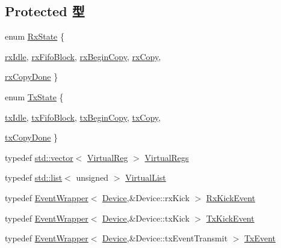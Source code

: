 \subsection*{Protected 型}
\begin{DoxyCompactItemize}
\item 
enum \hyperlink{classSinic_1_1Device_afa22e66eb5ea0daab0f0cd0360936f82}{RxState} \{ \par
\hyperlink{classSinic_1_1Device_afa22e66eb5ea0daab0f0cd0360936f82ab702fffa03e4cec4b054f71cfe34ce7c}{rxIdle}, 
\hyperlink{classSinic_1_1Device_afa22e66eb5ea0daab0f0cd0360936f82acd42510cc5c902cc3b338fee8106b4ca}{rxFifoBlock}, 
\hyperlink{classSinic_1_1Device_afa22e66eb5ea0daab0f0cd0360936f82ad650f06241a5757f0fa65acae2960b1f}{rxBeginCopy}, 
\hyperlink{classSinic_1_1Device_afa22e66eb5ea0daab0f0cd0360936f82acc200faa35bf75419147de6b805d083b}{rxCopy}, 
\par
\hyperlink{classSinic_1_1Device_afa22e66eb5ea0daab0f0cd0360936f82a8fbf22d6f8cc55993cc2a09d07418446}{rxCopyDone}
 \}
\item 
enum \hyperlink{classSinic_1_1Device_a96f29317c7f6628ea6a0c1bc5ab05d6a}{TxState} \{ \par
\hyperlink{classSinic_1_1Device_a96f29317c7f6628ea6a0c1bc5ab05d6aa6ae23f58218fed48a3f17abba689fcb6}{txIdle}, 
\hyperlink{classSinic_1_1Device_a96f29317c7f6628ea6a0c1bc5ab05d6aaf6571d0685a78da76fe4116ae36afdc3}{txFifoBlock}, 
\hyperlink{classSinic_1_1Device_a96f29317c7f6628ea6a0c1bc5ab05d6aaf2c21c54301af068a37b641c220915c1}{txBeginCopy}, 
\hyperlink{classSinic_1_1Device_a96f29317c7f6628ea6a0c1bc5ab05d6aa76918a4583683f130898f157b820164c}{txCopy}, 
\par
\hyperlink{classSinic_1_1Device_a96f29317c7f6628ea6a0c1bc5ab05d6aa60ba4d6a047deb74d1eccb2904472127}{txCopyDone}
 \}
\item 
typedef \hyperlink{classstd_1_1vector}{std::vector}$<$ \hyperlink{structSinic_1_1Device_1_1VirtualReg}{VirtualReg} $>$ \hyperlink{classSinic_1_1Device_aa30f329d058c1b4134f557c529c86ca2}{VirtualRegs}
\item 
typedef \hyperlink{classstd_1_1list}{std::list}$<$ unsigned $>$ \hyperlink{classSinic_1_1Device_a825103ea4ae04062ca13fa65d29bcfc6}{VirtualList}
\item 
typedef \hyperlink{classEventWrapper}{EventWrapper}$<$ \hyperlink{classSinic_1_1Device}{Device},\&Device::rxKick $>$ \hyperlink{classSinic_1_1Device_a1094ea52a2a9cb27d833549a0407932d}{RxKickEvent}
\item 
typedef \hyperlink{classEventWrapper}{EventWrapper}$<$ \hyperlink{classSinic_1_1Device}{Device},\&Device::txKick $>$ \hyperlink{classSinic_1_1Device_ad902ad2446ba2b0506a150072f971da5}{TxKickEvent}
\item 
typedef \hyperlink{classEventWrapper}{EventWrapper}$<$ \hyperlink{classSinic_1_1Device}{Device},\&Device::txEventTransmit $>$ \hyperlink{classSinic_1_1Device_a9a650a51d23bb10d0de3cb621d918e50}{TxEvent}
\end{DoxyCompactItemize}
